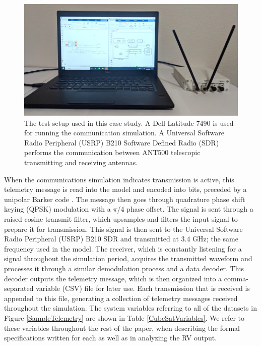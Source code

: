 \documentclass[conf]{new-aiaa}
\begin{document}
\begin{figure}[!h]
\centering
\includegraphics[width=1\textwidth]{Fig/Hardware.png}
\caption{The test setup used in this case study. A Dell Latitude 7490 is used for running the communication simulation. A Universal Software Radio Peripheral (USRP) B210 Software Defined Radio (SDR) performs the communication between ANT500 telescopic transmitting and receiving antennas.}
\label{Hardware}
\end{figure}

When the communications simulation indicates transmission is active, this telemetry message is read into the model and encoded into bits, preceded by a unipolar Barker code \cite{Barker1953,Soba2013}. The message then goes through quadrature phase shift keying (QPSK) modulation with a $\pi$/4 phase offset. The signal is sent through a raised cosine transmit filter, which upsamples and filters the input signal to prepare it for transmission. This signal is then sent to the Universal Software Radio Peripheral (USRP) B210 SDR and transmitted at 3.4 GHz; the same frequency used in the model. The receiver, which is constantly listening for a signal throughout the simulation period, acquires the transmitted waveform and processes it through a similar demodulation process and a data decoder.
This decoder outputs the telemetry message, which is then organized into a comma-separated variable (CSV) file for later use. Each transmission that is received is appended to this file, generating a collection of telemetry messages received throughout the simulation. The system variables referring to all of the datasets in Figure \ref{SampleTelemetry} are shown in Table \ref{CubeSatVariables}. We refer to these variables throughout the rest of the paper, when describing the formal specifications written for each as well as in analyzing the RV output.\\
\end{document}
